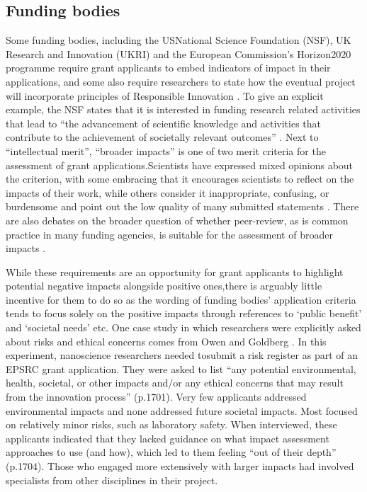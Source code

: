 \documentclass[11pt,english]{article}
\begin{document}
\subsection{Funding bodies}

Some funding bodies, including the USNational Science Foundation (NSF), UK Research and Innovation (UKRI) and the European Commission's Horizon2020 programme require grant applicants to embed indicators of impact in their applications, and some also require researchers to state how the eventual project will incorporate principles of Responsible Innovation \citep{epsrc_framework_2020}. To give an explicit example, the NSF states that it is interested in funding research related activities that lead to ``the advancement of scientific knowledge and activities that contribute to the achievement of societally relevant outcomes'' \citep{nsf_proposal_2018}. Next to ``intellectual merit'', ``broader impacts'' is one of two merit criteria for the assessment of grant applications.Scientists have expressed mixed opinions about the criterion, with some embracing that it encourages scientists to reflect on the impacts of their work, while others consider it inappropriate, confusing, or burdensome and point out the low quality of many submitted statements \citep{tretkoff_nsfs_2007,frodeman_sciences_2007}. There are also debates on the broader question of whether peer-review, as is common practice in many funding agencies, is suitable for the assessment of broader impacts \citep{bozeman_broad_2009,holbrook_peer_2011,bozeman_socio-economic_2017,hecht_its_2018}. 

While these requirements are an opportunity for grant applicants to highlight potential negative impacts alongside positive ones,there is arguably little incentive for them to do so as the wording of funding bodies' application criteria tends to focus solely on the positive impacts through references to `public benefit' and `societal needs' etc. One case study in which researchers were explicitly asked about risks and ethical concerns comes from Owen and Goldberg \citep{owen_responsible_2010}. In this experiment, nanoscience researchers needed tosubmit a risk register as part of an EPSRC grant application. They were asked to list ``any potential environmental, health, societal, or other impacts and/or any ethical concerns that may result from the innovation process'' (p.1701). Very few applicants addressed environmental impacts and none addressed future societal impacts. Most focused on relatively minor risks, such as laboratory safety. When interviewed, these applicants indicated that they lacked guidance on what impact assessment approaches to use (and how), which led to them feeling ``out of their depth'' (p.1704). Those who engaged more extensively with larger impacts had involved specialists from other disciplines in their project. 
\end{document}
